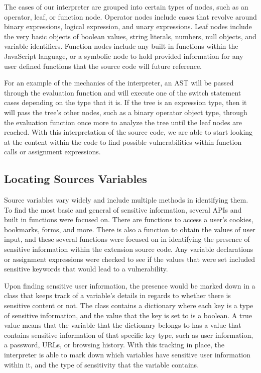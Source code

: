 \documentclass[jou,apacite]{apa6}
\begin{document}
		The cases of our interpreter are grouped into certain types of nodes, such as an operator, leaf, or function node. Operator nodes include cases that revolve around binary expressions, logical expression, and unary expressions. Leaf nodes include the very basic objects of boolean values, string literals, numbers, null objects, and variable identifiers. Function nodes include any built in functions within the JavaScript language, or a symbolic node to hold provided information for any user defined functions that the source code will future reference.

		For an example of the mechanics of the interpreter, an AST will be passed through the evaluation function and will execute one of the switch statement cases depending on the type that it is. If the tree is an expression type, then it will pass the tree’s other nodes, such as a binary operator object type, through the evaluation function once more to analyze the tree until the leaf nodes are reached. With this interpretation of the source code, we are able to start looking at the content within the code to find possible vulnerabilities within function calls or assignment expressions.

	\subsection{Locating Sources Variables}

		Source variables vary widely and include multiple methods in identifying them. To find the most basic and general of sensitive information, several APIs and built in functions were focused on. There are functions to access a user’s cookies, bookmarks, forms, and more. There is also a function to obtain the values of user input, and these several functions were focused on in identifying the presence of sensitive information within the extension source code. Any variable declarations or assignment expressions were checked to see if the values that were set included sensitive keywords that would lead to a vulnerability.

		Upon finding sensitive user information, the presence would be marked down in a class that keeps track of a variable’s details in regards to whether there is sensitive content or not. The class contains a dictionary where each key is a type of sensitive information, and the value that the key is set to is a boolean. A true value means that the variable that the dictionary belongs to has a value that contains sensitive information of that specific key type, such as user information, a password, URLs, or browsing history. With this tracking in place, the interpreter is able to mark down which variables have sensitive user information within it, and the type of sensitivity that the variable contains.
\end{document}

